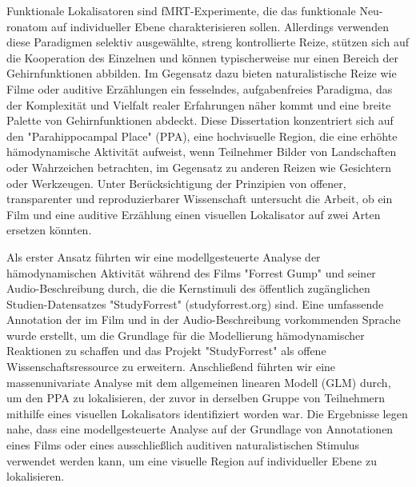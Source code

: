 Funktionale Lokalisatoren sind fMRT-Experimente, die das funktionale Neu-
ronatom auf individueller Ebene charakterisieren sollen.
Allerdings verwenden diese Paradigmen selektiv ausgewählte, streng
kontrollierte Reize, stützen sich auf die Kooperation des Einzelnen und können
typischerweise nur einen Bereich der Gehirnfunktionen abbilden. Im Gegensatz
dazu bieten naturalistische Reize wie Filme oder auditive Erzählungen ein
fesselndes, aufgabenfreies Paradigma, das der Komplexität und Vielfalt realer
Erfahrungen näher kommt und eine breite Palette von Gehirnfunktionen abdeckt.
Diese Dissertation konzentriert sich auf den "Parahippocampal Place" (PPA),
eine hochvisuelle Region, die eine erhöhte hämodynamische Aktivität aufweist,
wenn Teilnehmer Bilder von Landschaften oder Wahrzeichen betrachten, im
Gegensatz zu anderen Reizen wie Gesichtern oder Werkzeugen. Unter
Berücksichtigung der Prinzipien von offener, transparenter und reproduzierbarer
Wissenschaft untersucht die Arbeit, ob ein Film und eine auditive Erzählung
einen visuellen Lokalisator auf zwei Arten ersetzen könnten.

Als erster Ansatz führten wir eine modellgesteuerte Analyse der hämodynamischen
Aktivität während des Films "Forrest Gump" und seiner Audio-Beschreibung durch,
die die Kernstimuli des öffentlich zugänglichen Studien-Datensatzes
"StudyForrest" (studyforrest.org) sind. Eine umfassende Annotation der im Film
und in der Audio-Beschreibung vorkommenden Sprache wurde erstellt, um die
Grundlage für die Modellierung hämodynamischer Reaktionen zu schaffen und das
Projekt "StudyForrest" als offene Wissenschaftsressource zu erweitern.
Anschließend führten wir eine massenunivariate Analyse mit dem allgemeinen
linearen Modell (GLM) durch, um den PPA zu lokalisieren, der zuvor in derselben
Gruppe von Teilnehmern mithilfe eines visuellen Lokalisators identifiziert
worden war.
Die Ergebnisse legen nahe, dass eine modellgesteuerte Analyse auf der Grundlage
von Annotationen eines Films oder eines ausschließlich auditiven
naturalistischen Stimulus verwendet werden kann, um eine visuelle Region auf
individueller Ebene zu lokalisieren.

